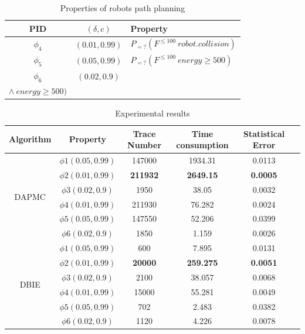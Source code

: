 \begin{table}[t]
	\renewcommand{\arraystretch}{1.2}
	\caption{Properties of robots path planning}
	\label{tb:robot}
	\centering
	\begin{tabular}{c c l}
		\hline
		~PID~ & $(\delta,c)$ & Property\\
		\hline
		$\phi_4$ & $(0.01,0.99)$ & $P_{=?}(F^{\leq100}~robot.collision)$ \\ 
		$\phi_5$ & $(0.05,0.99)$ & $P_{=?}(F^{\leq100}~energy \geq 500)$ \\
		$\phi_6$ & $(0.02,0.9)$ & 
		\tabincell{c}{$P_{=?}(F^{\leq100}~robot.collision$ \\ $\wedge~energy \geq 500)$}\\
		\hline
	\end{tabular}
\end{table}
\begin{table}
\caption{Experimental results}
\centering
\begin{tabular}{c c c c c c} 
        \hline  
        Algorithm & Property & Trace Number & Time consumption & Statistical Error\\
        \hline
        \multirow{6}{1.5cm}{DAPMC}  
                & $\phi1(0.05,0.99)$ &  147000&  1934.31&  0.0113\\ 
                & $\phi2(0.01,0.99)$ &  \textbf{211932} &  \textbf{2649.15} &  \textbf{0.0005}\\ 
                & $\phi3(0.02,0.9)$ &  1950&     38.05& 0.0032\\ 
                & $\phi4(0.01,0.99)$ &  211930&  76.282 &  0.0024\\ 
                & $\phi5(0.05,0.99)$ &  147550&  52.206&  0.0399\\ 
                & $\phi6(0.02,0.9)$ &  1850&     1.159& 0.0026\\     
        \hline 
        \multirow{6}{1.5cm}{DBIE}  
                & $\phi1(0.05,0.99)$ &  600&  7.895&  0.0131\\ 
                & $\phi2(0.01,0.99)$ &  \textbf{20000}&  \textbf{259.275} &  \textbf{0.0051} \\ 
                & $\phi3(0.02,0.9)$ &  2100& 38.057& 0.0068\\ 
                & $\phi4(0.01,0.99)$ & 15000&  55.281 &  0.0049\\ 
                & $\phi5(0.05,0.99)$ &  702&  2.483&  0.0382\\ 
                & $\phi6(0.02,0.9)$ &  1120& 4.226& 0.0078\\      

\end{tabular}
\end{table}
